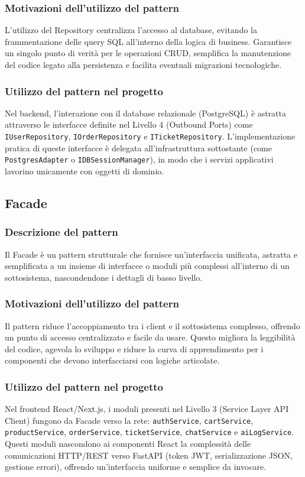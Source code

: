 \documentclass[a4paper, 11pt, oneside]{scrartcl}
\begin{document}
\subsubsection{Motivazioni dell'utilizzo del pattern}
L'utilizzo del Repository centralizza l'accesso al database, evitando la frammentazione delle query SQL all'interno della logica di business. Garantisce un singolo punto di verità per le operazioni CRUD, semplifica la manutenzione del codice legato alla persistenza e facilita eventuali migrazioni tecnologiche.

\subsubsection{Utilizzo del pattern nel progetto}
Nel backend, l'interazione con il database relazionale (PostgreSQL) è astratta attraverso le interfacce definite nel Livello 4 (Outbound Ports) come \texttt{IUserRepository}, \texttt{IOrderRepository} e \texttt{ITicketRepository}. L'implementazione pratica di queste interfacce è delegata all'infrastruttura sottostante (come \texttt{PostgresAdapter} o \texttt{IDBSessionManager}), in modo che i servizi applicativi lavorino unicamente con oggetti di dominio.

\subsection{Facade}

\subsubsection{Descrizione del pattern}
Il Facade è un pattern strutturale che fornisce un'interfaccia unificata, astratta e semplificata a un insieme di interfacce o moduli più complessi all'interno di un sottosistema, nascondendone i dettagli di basso livello.

\subsubsection{Motivazioni dell'utilizzo del pattern}
Il pattern riduce l'accoppiamento tra i client e il sottosistema complesso, offrendo un punto di accesso centralizzato e facile da usare. Questo migliora la leggibilità del codice, agevola lo sviluppo e riduce la curva di apprendimento per i componenti che devono interfacciarsi con logiche articolate.

\subsubsection{Utilizzo del pattern nel progetto}
Nel frontend React/Next.js, i moduli presenti nel Livello 3 (Service Layer API Client) fungono da Facade verso la rete: \texttt{authService}, \texttt{cartService}, \texttt{productService}, \texttt{orderService}, \texttt{ticketService}, \texttt{chatService} e \texttt{aiLogService}. Questi moduli nascondono ai componenti React la complessità delle comunicazioni HTTP/REST verso FastAPI (token JWT, serializzazione JSON, gestione errori), offrendo un'interfaccia uniforme e semplice da invocare.
\end{document}
